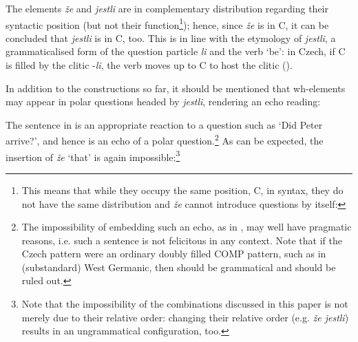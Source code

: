 \documentclass[output=paper,modfonts, hidelinks, newtxmath]{langscibook}
\begin{document}
\noindent The elements \textit{že} and \textit{jestli} are in complementary distribution regarding their syntactic position (but not their function\footnote{This means that while they occupy the same position, C, in syntax, they do not have the same distribution and \textit{že} cannot introduce questions by itself:

\z 

}); hence, since \textit{že} is in C, it can be concluded that \textit{jestli} is in C, too. This is in line with the etymology of \textit{jestli}, a grammaticalised form of the question particle \textit{li} and the verb `be': in Czech, if C is filled by the clitic -\textit{li}, the verb moves up to C to host the clitic (\citealt{schwabe2004}).

In addition to the constructions so far, it should be mentioned that wh-elements may appear in polar questions headed by \textit{jestli}, rendering an echo reading:

\ea
	\z 
\z 

\noindent The sentence in  is an appropriate reaction to a question such as `Did Peter arrive?', and hence is an echo of a polar question.\footnote{The impossibility of embedding such an echo, as in , may well have pragmatic reasons, i.e. such a sentence is not felicitous in any context. Note that if the Czech pattern were an ordinary doubly filled COMP pattern, such as in (substandard) West Germanic, then  should be grammatical and  should be ruled out.} As can be expected, the insertion of \textit{že} `that' is again impossible:\footnote{Note that the impossibility of the combinations discussed in this paper is not merely due to their relative order: changing their relative order (e.g. \textit{že jestli}) results in an ungrammatical configuration, too.}
\end{document}
